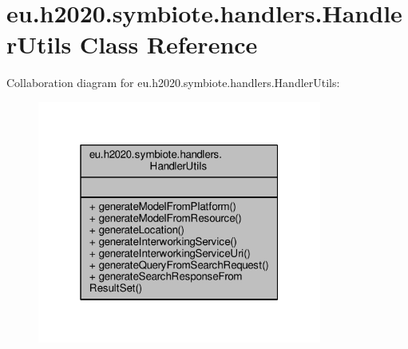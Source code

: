 \hypertarget{classeu_1_1h2020_1_1symbiote_1_1handlers_1_1HandlerUtils}{}\section{eu.\+h2020.\+symbiote.\+handlers.\+Handler\+Utils Class Reference}
\label{classeu_1_1h2020_1_1symbiote_1_1handlers_1_1HandlerUtils}


Collaboration diagram for eu.\+h2020.\+symbiote.\+handlers.\+Handler\+Utils\+:
\nopagebreak
\begin{figure}[H]
\begin{center}
\leavevmode
\includegraphics[width=265pt]{classeu_1_1h2020_1_1symbiote_1_1handlers_1_1HandlerUtils__coll__graph}
\end{center}
\end{figure}
